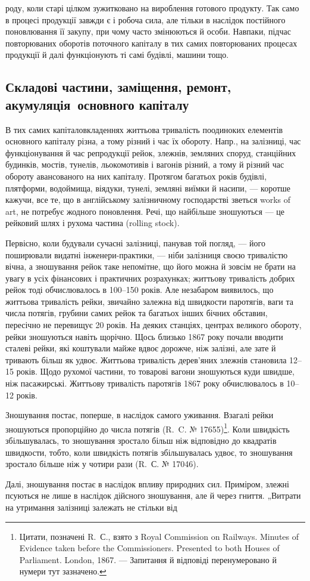 \parcont{}  %
роду, коли старі цілком зужитковано на вироблення готового продукту. Так само в процесі продукції
завжди є і робоча сила, але тільки в наслідок постійного поновлювання її закупу, при чому часто
змінюються й особи. Навпаки, підчас повторюваних оборотів поточного капіталу в тих самих
повторюваних процесах продукції й далі функціонують ті самі будівлі, машини тощо.

\subsection{Складові частини, заміщення, ремонт, акумуляція~основного капіталу}
В тих самих капіталовкладеннях життьова тривалість поодиноких елементів основного капіталу різна, а
тому різний і час їх обороту. Напр., на залізниці, час функціонування й час репродукції рейок,
злежнів, земляних споруд, станційних будинків, мостів, тунелів, льокомотивів і вагонів різний, а
тому й різний час обороту авансованого на них капіталу. Протягом багатьох років будівлі, плятформи,
водоймища, віядуки, тунелі,
земляні виїмки й насипи, — коротше кажучи, все те, що в англійському залізничному господарстві
зветься works of art, не потребує жодного поновлення. Речі, що найбільше зношуються — це рейковий
шлях і рухома частина (rolling stock).

Первісно, коли будували сучасні залізниці, панував той погляд, — його поширювали видатні
інженери-практики, — ніби залізниця своєю тривалістю вічна, а зношування рейок таке непомітне, що
його можна й зовсім не брати на увагу в усіх фінансових і практичних розрахунках; життьову
тривалість добрих рейок тоді обчислювалось в 100--150 років. Але незабаром виявилось, що життьова
тривалість рейки, звичайно залежна від швидкости паротягів, ваги та числа потягів, грубини самих
рейок та багатьох інших бічних обставин, пересічно не перевищує 20 років.
На деяких станціях, центрах великого обороту, рейки зношуються навіть щорічно. Щось близько 1867
року почали вводити сталеві рейки, які коштували майже вдвоє дорожче, ніж залізні, але зате й
тривають більш як удвоє. Життьова тривалість дерев’яних злежнів становила 12--15 років. Щодо рухомої
частини, то товарові вагони зношуються куди швидше, ніж пасажирські. Життьову тривалість паротягів
1867 року обчислювалось в 10--12 років.

Зношування постає, поперше, в наслідок самого уживання. Взагалі рейки зношуються пропорційно до
числа потягів (R.~C. № \num{17655})\footnote{
Цитати, позначені R.~С., взято з Royal Commission on Railways. Minutes of Evidence taken before
the Commissioners. Presented to both Houses of Parliament. London, 1867. — Запитання й відповіді
перенумеровано й нумери тут зазначено.
}. Коли швидкість збільшувалась, то зношування зростало більш ніж
відповідно до квадратів швидкости, тобто, коли швидкість потягів збільшувалась удвоє, то зношування
зростало більше ніж у чотири рази (R.~С. № \num{17046}).

Далі, зношування постає в наслідок впливу природних сил. Приміром, злежні псуються не лише в
наслідок дійсного зношування, але й через гниття. „Витрати на утримання залізниці залежать не
стільки від
\parbreak{}  %
